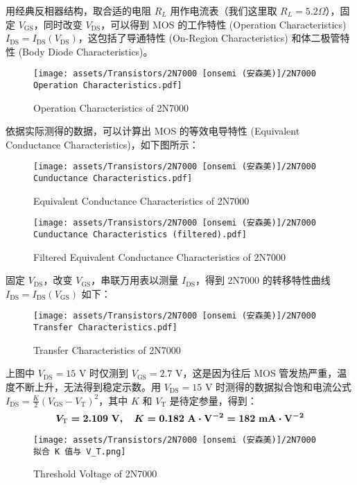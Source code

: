 \documentclass[UTF8]{report}
\begin{document}
用经典反相器结构，取合适的电阻 $R_L$ 用作电流表（我们这里取 $R_L = 5.2 \Omega$），固定 $V_\text{GS}$，同时改变 $V_\text{DS}$，可以得到 MOS 的工作特性 (Operation Characteristics) $I_\text{DS} = I_\text{DS}(V_\text{DS})$，这包括了导通特性 (On-Region Characteristics) 和体二极管特性 (Body Diode Characteristics)。
\begin{figure}[H]\centering
    \texttt{[image: assets/Transistors/2N7000 [onsemi (安森美)]/2N7000 Operation Characteristics.pdf]}
    \caption{Operation Characteristics of 2N7000}
\end{figure}
依据实际测得的数据，可以计算出 MOS 的等效电导特性 (Equivalent Conductance Characteristics)，如下图所示：
\begin{figure}[H]\centering
    \texttt{[image: assets/Transistors/2N7000 [onsemi (安森美)]/2N7000 Cunductance Characteristics.pdf]}
    \caption{Equivalent Conductance Characteristics of 2N7000}
\end{figure}
\begin{figure}[H]\centering
    \texttt{[image: assets/Transistors/2N7000 [onsemi (安森美)]/2N7000 Cunductance Characteristics (filtered).pdf]}
    \caption{Filtered Equivalent Conductance Characteristics of 2N7000}
\end{figure}

固定 $V_{\text{DS}}$，改变 $V_\text{GS}$，串联万用表以测量 $I_\text{DS}$，得到 2N7000 的转移特性曲线 $I_\text{DS} = I_\text{DS}(V_\text{GS})$ 如下：
\begin{figure}[H]\centering
    \texttt{[image: assets/Transistors/2N7000 [onsemi (安森美)]/2N7000 Transfer Characteristics.pdf]}
    \caption{Transfer Characteristics of 2N7000}
\end{figure}
上图中 $V_\text{DS} = 15$ V 时仅测到 $V_\text{GS} = 2.7$ V，这是因为往后 MOS 管发热严重，温度不断上升，无法得到稳定示数。用 $V_\text{DS} = 15$ V 时测得的数据拟合饱和电流公式 $I_\text{DS} = \frac{K}{2} \left( V_\text{GS} - V_\text{T} \right)^2$，其中 $K$ 和 $V_\text{T}$ 是待定参量，得到：
\begin{equation}
\boldmath V_\text{T} = 2.109 \ \mathrm{V},\quad K = 0.182 \ \mathrm{A\cdot V^{-2}} = 182 \ \mathrm{mA\cdot V^{-2}}
\end{equation}

\begin{figure}[H]\centering
    \texttt{[image: assets/Transistors/2N7000 [onsemi (安森美)]/2N7000 拟合 K 值与 V\_T.png]}
    \caption{Threshold Voltage of 2N7000}
\end{figure}
\end{document}

